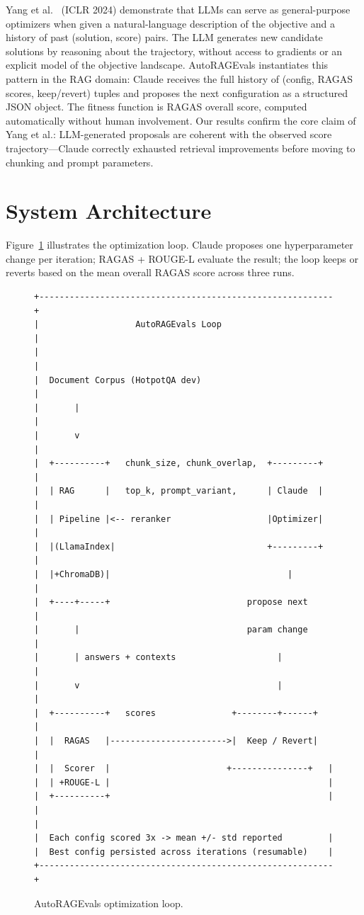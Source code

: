 \documentclass[11pt,a4paper]{article}
\begin{document}
Yang et al.~\cite{yang2024large} (ICLR 2024) demonstrate that LLMs can serve
as general-purpose optimizers when given a natural-language description of the
objective and a history of past (solution, score) pairs. The LLM generates new
candidate solutions by reasoning about the trajectory, without access to
gradients or an explicit model of the objective landscape. AutoRAGEvals
instantiates this pattern in the RAG domain: Claude receives the full history
of (config, RAGAS scores, keep/revert) tuples and proposes the next
configuration as a structured JSON object. The fitness function is RAGAS overall
score, computed automatically without human involvement. Our results confirm the
core claim of Yang et al.: LLM-generated proposals are coherent with the
observed score trajectory---Claude correctly exhausted retrieval improvements
before moving to chunking and prompt parameters.

\section{System Architecture}

Figure~\ref{fig:architecture} illustrates the optimization loop. Claude
proposes one hyperparameter change per iteration; RAGAS + ROUGE-L evaluate the
result; the loop keeps or reverts based on the mean overall RAGAS score across
three runs.

\begin{figure}[ht]
\centering
\begin{verbatim}
+----------------------------------------------------------+
|                   AutoRAGEvals Loop                      |
|                                                          |
|  Document Corpus (HotpotQA dev)                          |
|       |                                                  |
|       v                                                  |
|  +----------+   chunk_size, chunk_overlap,  +---------+  |
|  | RAG      |   top_k, prompt_variant,      | Claude  |  |
|  | Pipeline |<-- reranker                   |Optimizer|  |
|  |(LlamaIndex|                              +---------+  |
|  |+ChromaDB)|                                   |        |
|  +----+-----+                           propose next     |
|       |                                 param change     |
|       | answers + contexts                    |          |
|       v                                       |          |
|  +----------+   scores               +--------+------+   |
|  |  RAGAS   |----------------------->|  Keep / Revert|   |
|  |  Scorer  |                       +---------------+   |
|  | +ROUGE-L |                                           |
|  +----------+                                           |
|                                                          |
|  Each config scored 3x -> mean +/- std reported         |
|  Best config persisted across iterations (resumable)    |
+----------------------------------------------------------+
\end{verbatim}
\caption{AutoRAGEvals optimization loop.}
\label{fig:architecture}
\end{figure}
\end{document}
